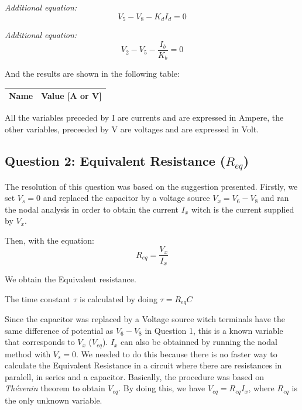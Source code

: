 \emph{Additional equation:}
\begin{equation}
     V_5 - V_8 - K_dI_d = 0
\end{equation}\par

\emph{Additional equation:}
\begin{equation}
     V_2 - V_5 - \frac{I_b}{K_b} = 0
\end{equation}\par

And the results are shown in the following table:

\begin{center}
  \begin{tabular}{ | c | c | }
    \hline    
    {\bf Name} & {\bf Value [A or V]} \\ \hline
    
    \hline
  \end{tabular}
\end{center}
All the variables preceded by I are currents and are expressed in Ampere, the other variables, preceeded by V are voltages and are expressed in Volt.



\subsection{Question 2: Equivalent Resistance ($R_{eq}$)}
The resolution of this question was based on the suggestion presented. Firstly, we set $V_s =0$ and replaced the capacitor by a voltage source $V_x = V_6 - V_8$ and ran the nodal analysis in order to obtain the current $I_x$ witch is the current supplied by $V_x$.\par
Then, with the equation: 
\begin{equation}
     R_{eq} = \frac{V_x}{I_x}
\end{equation}\par
We obtain the Equivalent resistance. \par 
The time constant $\tau$ is calculated by doing $\tau=R_{eq}C$\par
 Since the capacitor was replaced by a Voltage source witch terminals have the same difference of potential as $V_6 - V_8$ in Question 1, this is a known variable that corresponds to $V_x$ ($V_{eq}$). $I_x$ can also be obtainned by running the nodal method with $V_s = 0$. We needed to do this because there is no faster way to calculate the Equivalent Resistance in a circuit where there are resistances in paralell, in series and a capacitor. Basically, the procedure was based on \emph{Thévenin} theorem to obtain $V_{eq}$. By doing this, we have $V_{eq}=R_{eq}I_x$, where $R_{eq}$ is the only unknown variable. \par

